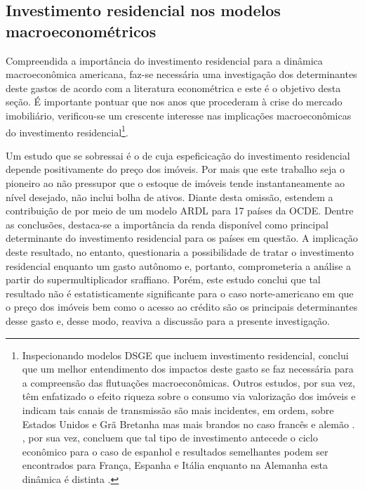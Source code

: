 \subsection{Investimento residencial nos modelos macroeconométricos}\label{RevEmpirica}

Compreendida a importância do investimento residencial para a dinâmica macroeconômica americana, faz-se necessária uma investigação dos determinantes deste gastos de acordo com a literatura econométrica e este é o objetivo desta seção. 
É importante pontuar que nos anos que procederam à crise do mercado imobiliário, verificou-se um crescente interesse nas implicações macroeconômicas do investimento residencial\footnote{Inspecionando modelos DSGE que incluem investimento residencial, \textcite{iacoviello_housing_2010} conclui que um melhor entendimento dos impactos deste gasto se faz necessária para a compreensão das flutuações macroeconômicas. Outros estudos, por sua vez, têm enfatizado o efeito riqueza sobre o consumo via valorização dos imóveis e indicam tais canais de transmissão são mais incidentes, em ordem, sobre Estados Unidos e Grã Bretanha mas mais brandos no caso francês e alemão \cites{sastre_assessment_2010}{chauvin_wealth_2010}{bassanetti_effects_2010}{arrondel_housing_2010}. 
	\textcite{alvarez_does_2010}, por sua vez, concluem que tal tipo de investimento antecede o ciclo econômico para o caso de espanhol e resultados semelhantes podem ser encontrados para França, Espanha  e Itália enquanto na Alemanha esta dinâmica é distinta \cites{ferrara_common_2010}{ferrara_cyclical_2010}.}. 

Um estudo que se sobressai é o de \textcite{poterba_tax_1984}  cuja espeficicação do investimento residencial depende positivamente do preço dos imóveis. 
Por mais que este trabalho seja o pioneiro ao não pressupor que o estoque de imóveis tende instantaneamente ao nível desejado, não inclui bolha de ativos.
Diante desta omissão, 
\textcite{arestis_residential_2015} estendem a contribuição de 
\textcite{poterba_tax_1984} por meio de um modelo ARDL para 17 países da OCDE. 
Dentre as conclusões, destaca-se a importância da renda disponível como principal determinante do investimento residencial para os países em questão.  A implicação deste resultado, no entanto, questionaria a possibilidade de tratar o investimento residencial enquanto um gasto autônomo e, portanto, comprometeria a análise a partir do supermultiplicador sraffiano. Porém, este estudo conclui que tal resultado não é estatisticamente significante para o caso norte-americano em que o preço dos imóveis bem como o acesso ao crédito são os principais determinantes desse gasto e, desse modo, reaviva a discussão para a presente investigação.


